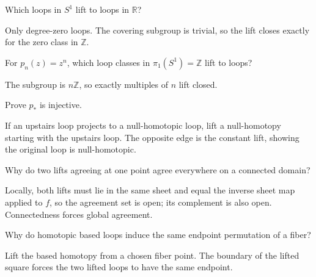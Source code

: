 \begin{problem}\label{prob:viii11-03}
Which loops in \(S^1\) lift to loops in \(\mathbb R\)?
\end{problem}
\begin{solution}
Only degree-zero loops.  The covering subgroup is trivial, so the lift closes exactly for the zero class in \(\mathbb Z\).
\end{solution}

\begin{problem}\label{prob:viii11-04}
For \(p_n(z)=z^n\), which loop classes in \(\pi_1(S^1)=\mathbb Z\) lift to loops?
\end{problem}
\begin{solution}
The subgroup is \(n\mathbb Z\), so exactly multiples of \(n\) lift closed.
\end{solution}

\begin{problem}\label{prob:viii11-05}
Prove \(p_*\) is injective.
\end{problem}
\begin{solution}
If an upstairs loop projects to a null-homotopic loop, lift a null-homotopy starting with the upstairs loop. The opposite edge is the constant lift, showing the original loop is null-homotopic.
\end{solution}

\begin{problem}\label{prob:viii11-06}
Why do two lifts agreeing at one point agree everywhere on a connected domain?
\end{problem}
\begin{solution}
Locally, both lifts must lie in the same sheet and equal the inverse sheet map applied to \(f\), so the agreement set is open; its complement is also open. Connectedness forces global agreement.
\end{solution}

\begin{problem}\label{prob:viii11-07}
Why do homotopic based loops induce the same endpoint permutation of a fiber?
\end{problem}
\begin{solution}
Lift the based homotopy from a chosen fiber point. The boundary of the lifted square forces the two lifted loops to have the same endpoint.
\end{solution}

